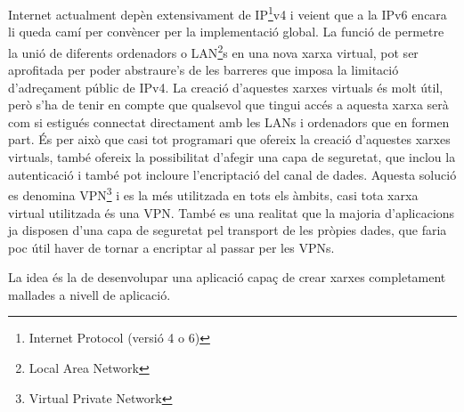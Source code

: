 Internet actualment depèn extensivament de IP\footnote{Internet Protocol (versió 4 o 6)}v4 i veient que a la IPv6 encara li queda camí per convèncer per la implementació global. La funció de permetre la unió de diferents ordenadors o LAN\footnote{Local Area Network}s en una nova xarxa virtual, pot ser aprofitada per poder abstraure's de les barreres que imposa la limitació d'adreçament públic de IPv4. La creació d'aquestes xarxes virtuals és molt útil, però s'ha de tenir en compte que qualsevol que tingui accés a aquesta xarxa serà com si estigués connectat directament amb les LANs i ordenadors que en formen part. És per això que casi tot programari que ofereix la creació d'aquestes xarxes virtuals, també ofereix la possibilitat d'afegir una capa de seguretat, que inclou la autenticació i també pot incloure l'encriptació del canal de dades. Aquesta solució es denomina VPN\footnote{Virtual Private Network} i es la més utilitzada en tots els àmbits, casi tota xarxa virtual utilitzada és una VPN.
També es una realitat que la majoria d'aplicacions ja disposen d'una capa de seguretat pel transport de les pròpies dades, que faria poc útil haver de tornar a encriptar al passar per les VPNs.

La idea és la de desenvolupar una aplicació capaç de crear xarxes completament mallades a nivell de aplicació.
